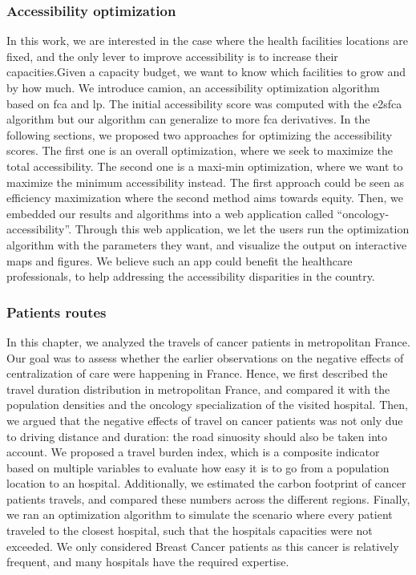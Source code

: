 \subsubsection{Accessibility optimization}
In this work, we are interested in the case where the health facilities locations are
fixed, and the only lever to improve accessibility is to increase their
capacities.Given a capacity budget, we want to know which facilities to grow and
by how much. We introduce \ac{camion}, an accessibility optimization algorithm
based on \ac{fca} and \ac{lp}. The initial accessibility score was computed with
the \ac{e2sfca} algorithm \cite{luo_enhanced_2009} but our algorithm can
generalize to more \ac{fca} derivatives. In the following sections, we proposed
two approaches for optimizing the accessibility scores. The first one is an
overall optimization, where we seek to maximize the total accessibility. The
second one is a maxi-min optimization, where we want to maximize the minimum
accessibility instead. The first approach could be seen as efficiency
maximization where the second method aims towards equity. Then, we embedded our
results and algorithms into a web application  called
``oncology-accessibility''. Through this web application, we let the users run
the optimization algorithm with the parameters they want, and visualize the
output on interactive maps and figures. We believe such an app could benefit the
healthcare professionals, to help addressing the accessibility disparities in
the country.

\subsubsection{Patients routes}
In this chapter, we analyzed the travels of cancer patients in metropolitan
France. Our goal was to assess whether the earlier observations on the negative
effects of centralization of care were happening in France. Hence, we first
described the travel duration distribution in metropolitan France, and compared
it with the population densities and the oncology specialization of the visited
hospital. Then, we argued that the negative effects of travel on cancer patients
was not only due to driving distance and duration: the road sinuosity should
also be taken into account. We proposed a travel burden index, which is a
composite indicator based on multiple variables to evaluate how easy it is to go
from a population location to an hospital. Additionally, we estimated the carbon
footprint of cancer patients travels, and compared these numbers across the
different regions. Finally, we ran an optimization algorithm to simulate the
scenario where every patient traveled to the closest hospital, such that the
hospitals capacities were not exceeded. We only considered Breast Cancer
patients as this cancer is relatively frequent, and many hospitals have the
required expertise.

